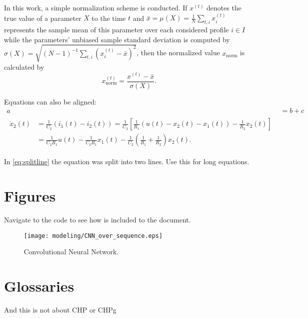 In this work, a simple normalization scheme is conducted.
If $x^{(t)}$ denotes the true value of a parameter $X$ to the time $t$ and $\bar{x} = \mu(X) = \frac{1}{N}\sum\nolimits_{t, i} x^{(t)}_i$ represents the sample mean of this parameter over each considered profile $i\in I$ while the parameters' unbiased sample standard deviation is computed by $\sigma(X)=\sqrt{(N-1)^{-1}\sum\nolimits_{t, i} (x^{(t)}_i - \bar{x})^2}$, then the normalized value $x_\text{norm}$ is calculated by  
\begin{equation}
	x_\text{norm}^{(t)} = \frac{x^{(t)}-\bar{x}}{\sigma(X)}.
\end{equation}

Equations can also be aligned:
\begin{align}
    a&=b+c\\
    \begin{split}
        \dot{x}_2(t)&= \frac{1}{C_2} \left( i_1(t)-i_2(t)\right)= \frac{1}{C_2} \left[ \frac{1}{R_1} \left(u(t)-x_2(t)-x_1(t) \right)-\frac{1}{R_2} x_2(t)\right]\\
        &= \frac{1}{C_2 R_1} u(t)-\frac{1}{C_2 R_1} x_1(t) - \frac{1}{C_2} \left( \frac{1}{R_1}+\frac{1}{R_2}\right) x_2(t). 
        \label{eq:splitline}
    \end{split}
\end{align}

In \eqref{eq:splitline} the equation was split into two lines. Use this for long equations.

\section{Figures}
\label{sec:architecture}
Navigate to the code to see how  is included to the document. 

\begin{figure}[htb]
	\centering
    \texttt{[image: modeling/CNN\_over\_sequence.eps]}
    \caption{Convolutional Neural Network.}
	\label{fig:cnn}
\end{figure}

\section{Glossaries}
And this is not about \acrshort{CHP} or \gls{CHPg}


